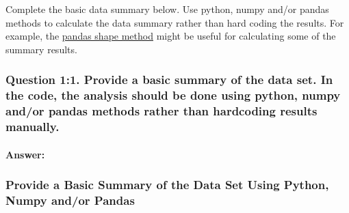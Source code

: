 \documentclass[11pt]{article}
\begin{document}
Complete the basic data summary below. Use python, numpy and/or pandas
methods to calculate the data summary rather than hard coding the
results. For example, the
\href{http://pandas.pydata.org/pandas-docs/stable/generated/pandas.DataFrame.shape.html}{pandas
shape method} might be useful for calculating some of the summary
results.

    \subsubsection{Question 1:1. Provide a basic summary of the data set. In
the code, the analysis should be done using python, numpy and/or pandas
methods rather than hardcoding results
manually.}\label{question-11.-provide-a-basic-summary-of-the-data-set.-in-the-code-the-analysis-should-be-done-using-python-numpy-andor-pandas-methods-rather-than-hardcoding-results-manually.}

    \paragraph{Answer:}\label{answer}

    \subsubsection{Provide a Basic Summary of the Data Set Using Python,
Numpy and/or
Pandas}\label{provide-a-basic-summary-of-the-data-set-using-python-numpy-andor-pandas}
\end{document}
